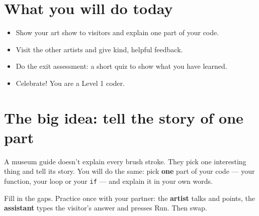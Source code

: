 
\section{What you will do today}
\begin{itemize}[leftmargin=1.2em,itemsep=1pt]
  \item Show your art show to visitors and explain one part of your code.
  \item Visit the other artists and give kind, helpful feedback.
  \item Do the exit assessment: a short quiz to show what you have learned.
  \item Celebrate! You are a Level 1 coder.
\end{itemize}

\section{The big idea: tell the story of one part}
A museum guide doesn't explain every brush stroke. They pick one interesting thing and tell its story. You will do the same: pick \textbf{one} part of your code --- your function, your loop or your \texttt{if} --- and explain it in your own words.

\begin{exercise}
Fill in the gaps. Practice once with your partner: the \textbf{artist} talks and points, the \textbf{assistant} types the visitor's answer and presses Run. Then swap.
\end{exercise}

